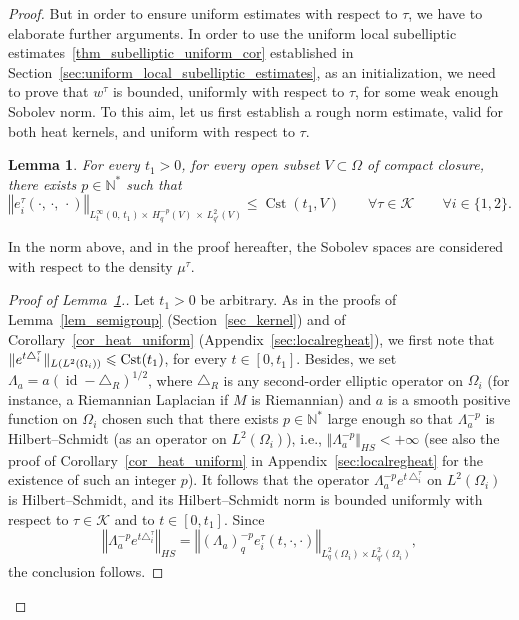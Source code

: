 \documentclass[10pt]{amsart}
\newtheorem{lemm}[theo]{Lemma}\newtheorem{prop}[theo]{Proposition}\newtheorem{coro}[theo]{Corollary}\newtheorem{conj}[theo]{Conjecture}
\theoremstyle{definition}\newtheorem{defi}[theo]{Definition}\newtheorem{rema}[theo]{Remark}\newtheorem{exam}[theo]{Example}\newtheorem{exem}[theo]{Example}\newtheorem{nota}[theo]{Notation}
\newcommand*\N{\mathbb{N}}
\newcommand{\calK}{\mathcal{K}}
\DeclareMathOperator{\Cst}{Cst}
\DeclareMathOperator{\id}{id}
\renewcommand{\leq}{\leqslant}
\let\oldforall\forall
\renewcommand*{\forall}{\mathrel{\oldforall}}
\begin{document}
\begin{proof}
But in order to ensure uniform estimates with respect to $\tau$, we have to elaborate further arguments. In order to use the uniform local subelliptic estimates~\eqref{thm_subelliptic_uniform_cor} established in Section~\ref{sec:uniform_local_subelliptic_estimates}, as an initialization, we need to prove that $w^\tau$ is bounded, uniformly with respect to $\tau$, for some weak enough Sobolev norm. To this aim, let us first establish a rough norm estimate, valid for both heat kernels, and uniform with respect to $\tau$.

\begin{lemm}\label{lem_rough_uniform}
For every $t_1>0$, for every open subset $V\subset\Omega$ of compact closure, there exists $p\in\N^*$ such that
\[
\left\Vert e^\tau_i(\cdot,\,\cdot,\,\cdot) \right\Vert_{L^\infty_t(0,\,t_1)\times\,H^{-p}_q(V)\,\times\,L^2_{q'}(V)} \leq \Cst(t_1,V)
\qquad\forall \tau\in\calK\qquad \forall i\in\{1,2\}.
\]
\end{lemm}

In the norm above, and in the proof hereafter, the Sobolev spaces are considered with respect to the density $\mu^\tau$.

\begin{proof}[{Proof of Lemma~\ref{lem_rough_uniform}.}]
Let $t_1>0$ be arbitrary. As in the proofs of Lemma~\ref{lem_semigroup} (Section~\ref{sec_kernel}) and of Corollary~\ref{cor_heat_uniform} (Appendix~\ref{sec:localregheat}), we first note that $\Vert e^{t\triangle^\tau_i}\Vert_{L(L^2(\Omega_i))}\linebreak\leq \Cst(t_1)$, for every $t\in[0,t_1]$. Besides, we set $\Lambda_a = a (\id-\triangle_R)^{1/2}$, where $\triangle_R$ is any second-order elliptic operator on $\Omega_i$ (for instance, a Riemannian Laplacian if $M$ is Riemannian) and $a$ is a smooth positive function on $\Omega_i$ chosen such that there exists $p\in\N^*$ large enough so that $\Lambda_a^{-p}$ is Hilbert--Schmidt (as an operator on $L^2(\Omega_i)$), i.e., $\Vert \Lambda_a^{-p} \Vert_{HS}<+\infty$ (see also the proof of Corollary~\ref{cor_heat_uniform} in Appendix~\ref{sec:localregheat} for the existence of such an integer $p$). It follows that the operator $\Lambda_a^{-p} e^{t\,\triangle^\tau_i}$ on $L^2(\Omega_i)$ is Hilbert--Schmidt, and its Hilbert--Schmidt norm is bounded uniformly with respect to $\tau\in\calK$ and to $t\in[0,t_1]$. Since
\[
\left\Vert \Lambda_a^{-p} e^{t\triangle^\tau_i}\right\Vert_{HS} = \left\Vert (\Lambda_a)_q^{-p} e^\tau_i(t,\cdot,\cdot)\right\Vert_{L^2_q(\Omega_i)\times L^2_{q'}(\Omega_i)},
\]
the conclusion follows.
\end{proof}


\end{proof}
\end{document}
